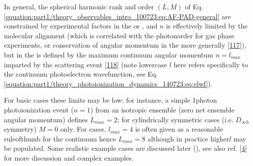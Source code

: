 \documentclass[letterpaper,table,10pt,english]{jupyterBook}
\begin{document}
\sphinxAtStartPar
In general, the spherical harmonic rank and order \((L,M)\) of Eq. \eqref{equation:part1/theory_observables_intro_100723:eq:AF-PAD-general} are constrained by experimental factors in the {\hyperref[\detokenize{backmatter/glossary:term-LF}]{}} or {\hyperref[\detokenize{backmatter/glossary:term-AF}]{}}, and \(n\) is effectively limited by the molecular alignment (which is correlated with the photon\sphinxhyphen{}order for gas phase experiments, or conservation of angular momentum in the {\hyperref[\detokenize{backmatter/glossary:term-LF}]{}} more generally {[}\hyperlink{cite.backmatter/bibliography:id980}{117}{]}), but in the {\hyperref[\detokenize{backmatter/glossary:term-MF}]{}} is defined by the maximum continuum angular momentum \(n=l_{max}\) imparted by the scattering event {[}\hyperlink{cite.backmatter/bibliography:id582}{118}{]} (note lower\sphinxhyphen{}case \(l\) here refers specifically to the continuum photoelectron wavefunction, see Eq. \eqref{equation:part1/theory_photoionization_dynamics_140723:eq:elwf}).

\sphinxAtStartPar
For basic cases these limits may be low: for instance, a simple 1\sphinxhyphen{}photon photoionization event (\(n=1\)) from an isotropic ensemble (zero net ensemble angular momentum) defines \(L_{max}=2\); for cylindrically symmetric cases (i.e. \(D_{\infty h}\) symmetry) \(M=0\) only. For {\hyperref[\detokenize{backmatter/glossary:term-MF}]{}} cases, \(l_{max}=4\) is often given as a reasonable rule\sphinxhyphen{}of\sphinxhyphen{}thumb for the continuum \sphinxhyphen{} hence \(L_{max}=8\) \sphinxhyphen{} although in practice higher\sphinxhyphen{}\(l\) may be populated. Some realistic example cases are discussed later ({\hyperref[\detokenize{part2/extracting_matrix_elements_overview_270423:chpt-extracting-matrix-elements-overview}]{}}), see also ref. {[}\hyperlink{cite.backmatter/bibliography:id677}{4}{]} for more discussion and complex examples.
\end{document}
